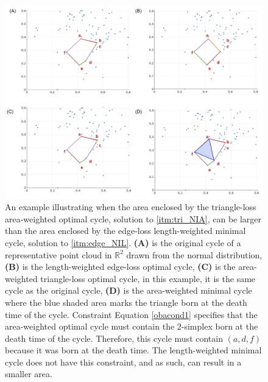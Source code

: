 \begin{figure}[h!]
\begin{center}
\includegraphics[width=15cm]{figures/areaexample.jpg}
\end{center}
\caption{An example illustrating when the area enclosed by the triangle-loss area-weighted optimal cycle, solution to \pr \ref{itm:tri_NIA}, can be larger than the area enclosed by the edge-loss length-weighted minimal cycle, solution to \pr \ref{itm:edge_NIL}. \textbf{(A)} is the original cycle of a representative point cloud in $\mathbb{R}^2$ drawn from the normal distribution, \textbf{(B)} is the length-weighted edge-loss optimal cycle, \textbf{(C)} is the area-weighted triangle-loss optimal cycle, in this example, it is the same cycle as the original cycle, \textbf{(D)} is the area-weighted minimal cycle where the blue shaded area marks the triangle born at the death time of the cycle.  
Constraint Equation \eqref{obacond1} specifies that the area-weighted optimal cycle must contain the 2-simplex born at the death time of the cycle. Therefore, this cycle must contain $(a,d,f)$ because it was born at the death time. The length-weighted minimal cycle does not have this constraint, and as such, can result in a smaller area. 
}\label{fig:areaExample}
\end{figure}


